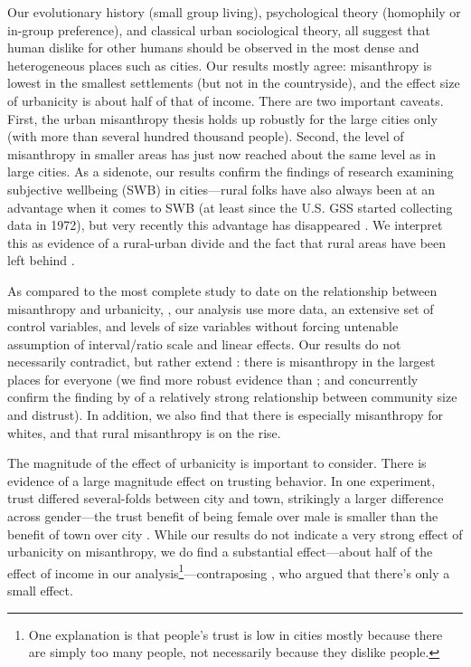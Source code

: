 \documentclass[11pt, letterpaper]{article}
\begin{document}
\begin{spacing}{1.4}
Our evolutionary history (small group living),  psychological theory (homophily or in-group preference), and classical urban sociological theory, all suggest that human dislike for other humans should be observed in the most dense and heterogeneous places such as cities. Our results mostly agree: misanthropy is lowest in the smallest settlements (but not in the countryside), and the effect size of urbanicity is about half of that of income.
%
There are two important caveats. First, the urban misanthropy thesis holds up robustly for the large cities only (with more than several hundred thousand people). Second, the level of misanthropy in smaller areas has just now reached about the same level as in large cities.  
% 
As a sidenote, our results confirm the findings of research examining subjective wellbeing (SWB) in cities---rural folks have also
always been at an advantage when it comes to SWB (at least since the U.S. GSS
started collecting data in 1972), but very recently this advantage has disappeared \citep{aok-swbGenYcity18}. We interpret this as evidence of a rural-urban divide and the fact that rural areas have been left behind \citep[e.g.,][]{fullerNYT17monD, hansonCityJournalautumn15}.

As compared to the most complete study to date on the relationship between
misanthropy and urbanicity, \citet{wilson85}, our analysis use more data, an extensive set of control variables, and levels of size variables without forcing untenable assumption of interval/ratio scale and linear effects. Our results do not necessarily contradict, but rather extend \citet{wilson85}: there is misanthropy in the largest places for everyone (we find more robust evidence than \citet{wilson85}; and concurrently confirm the finding by \citet{fischer81} of a relatively strong relationship between community size and distrust). In addition, we also find that there is especially misanthropy for whites, and that rural misanthropy is on the rise.

The magnitude of the effect of urbanicity is important to consider. There is evidence of a large magnitude effect on trusting behavior. In one experiment, trust differed several-folds between city and town, strikingly a larger difference across gender---the trust benefit of being female over male is smaller than the benefit of town over city \citep{milgram70}. While our results do not indicate a very strong effect of urbanicity on misanthropy, we do find a substantial effect---about half of the effect of income in our analysis\footnote{One explanation is that people's trust is low in cities mostly because there are simply too many people, not necessarily because they dislike people.}---contraposing \citet{wilson85}, who argued that there's only a small effect.


\end{spacing}
\end{document}
